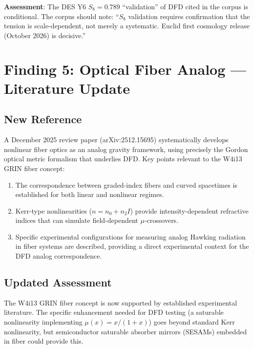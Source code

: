 \documentclass[11pt]{article}
\begin{document}
\textbf{Assessment}: The DES Y6 $S_8 = 0.789$ ``validation'' of DFD
cited in the corpus is conditional.  The corpus should note: ``$S_8$
validation requires confirmation that the tension is scale-dependent,
not merely a systematic.  Euclid first cosmology release (October 2026)
is decisive.''


\section{Finding 5: Optical Fiber Analog --- Literature Update}
\label{sec:fiber}

\subsection{New Reference}

A December 2025 review paper (arXiv:2512.15695) systematically develops
nonlinear fiber optics as an analog gravity framework, using precisely
the Gordon optical metric formalism that underlies DFD.  Key points
relevant to the W4i13 GRIN fiber concept:

\begin{enumerate}[nosep]
\item The correspondence between graded-index fibers and curved
  spacetimes is established for both linear and nonlinear regimes.
\item Kerr-type nonlinearities ($n = n_0 + n_2 I$) provide
  intensity-dependent refractive indices that can simulate
  field-dependent $\mu$-crossovers.
\item Specific experimental configurations for measuring analog Hawking
  radiation in fiber systems are described, providing a direct
  experimental context for the DFD analog correspondence.
\end{enumerate}

\subsection{Updated Assessment}

The W4i13 GRIN fiber concept is now supported by established
experimental literature.  The specific enhancement needed for DFD
testing (a saturable nonlinearity implementing $\mu(x) = x/(1+x)$)
goes beyond standard Kerr nonlinearity, but semiconductor saturable
absorber mirrors (SESAMs) embedded in fiber could provide this.
\end{document}
